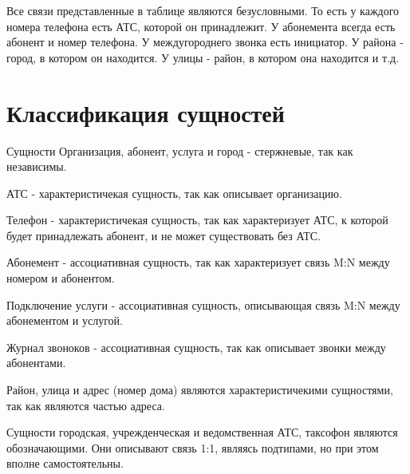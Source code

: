 \documentclass{report}
\begin{document}
Все связи представленные в таблице являются безусловными. То есть у каждого 
номера телефона есть АТС, которой он принадлежит. У абонемента всегда
есть абонент и номер телефона. У междугороднего звонка есть инициатор. 
У района - город, в котором он находится. У улицы - район, в котором она 
находится и т.д.

\section{Классификация сущностей}

Сущности Организация, абонент, услуга и город - стержневые, так как независимы. 

АТС - характеристичекая сущность, так как описывает организацию.

Телефон - характеристичекая сущность, 
так как характеризует АТС, к которой будет принадлежать абонент, и не может
существовать без АТС.

Абонемент - ассоциативная сущность, так как характеризует связь M:N между номером и абонентом.

Подключение услуги - ассоциативная сущность, описывающая связь M:N между 
абонементом и услугой.

Журнал звоноков - ассоциативная сущность, так как 
описывает звонки между абонентами.

Район, улица и адрес (номер дома) являются характеристичекими сущностями, 
так как являются частью адреса.

Сущности городская, учрежденческая и ведомственная АТС, таксофон являются
обозначающими. Они описывают связь 1:1, являясь подтипами, но при 
этом вполне самостоятельны. 
\end{document}
